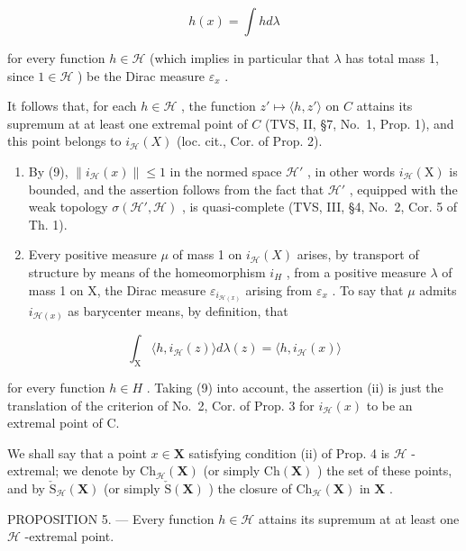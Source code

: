 \[
h (x) = \int h d \lambda\tag{10}
\]

for every function \(h \in \mathcal{H}\) (which implies in particular that \(\lambda\) has total mass 1, since \(1 \in \mathcal{H}\) ) be the Dirac measure \(\varepsilon_x\) .

It follows that, for each \(h \in \mathcal{H}\) , the function \(z' \mapsto \langle h, z' \rangle\) on \(C\) attains its supremum at at least one extremal point of \(C\) (TVS, II, §7, No.~1, Prop. 1), and this point belongs to \(i_{\mathcal{H}}(X)\) (loc. cit., Cor. of Prop. 2).

\begin{enumerate}
\def\labelenumi{(\roman{enumi})}
\item
  By (9), \(\| i_{\mathcal{H}}(x)\| \leqslant 1\) in the normed space \(\mathcal{H}'\) , in other words \(i_{\mathcal{H}}(\mathrm{X})\) is bounded, and the assertion follows from the fact that \(\mathcal{H}'\) , equipped with the weak topology \(\sigma (\mathcal{H}',\mathcal{H})\) , is quasi-complete (TVS, III, §4, No.~2, Cor. 5 of Th. 1).
\item
  Every positive measure \(\mu\) of mass 1 on \(i_{\mathcal{H}}(X)\) arises, by transport of structure by means of the homeomorphism \(i_{H}\) , from a positive measure \(\lambda\) of mass 1 on X, the Dirac measure \(\varepsilon_{i_{\mathcal{H}(x)}}\) arising from \(\varepsilon_{x}\) . To say that \(\mu\) admits \(i_{\mathcal{H}(x)}\) as barycenter means, by definition, that
\end{enumerate}

\[
\int_ {\mathrm{X}} \langle h, i _ {\mathcal {H}} (z) \rangle d \lambda (z) = \langle h, i _ {\mathcal {H}} (x) \rangle
\]

for every function \(h \in H\) . Taking (9) into account, the assertion (ii) is just the translation of the criterion of No.~2, Cor. of Prop. 3 for \(i_{\mathcal{H}}(x)\) to be an extremal point of C.

We shall say that a point \(x \in \mathbf{X}\) satisfying condition (ii) of Prop. 4 is \(\mathcal{H}\) -extremal; we denote by \(\mathrm{Ch}_{\mathcal{H}}(\mathbf{X})\) (or simply \(\mathrm{Ch}(\mathbf{X})\) ) the set of these points, and by \(\check{\mathrm{S}}_{\mathcal{H}}(\mathbf{X})\) (or simply \(\check{\mathrm{S}}(\mathbf{X})\) ) the closure of \(\mathrm{Ch}_{\mathcal{H}}(\mathbf{X})\) in \(\mathbf{X}\) .

PROPOSITION 5. --- Every function \(h \in \mathcal{H}\) attains its supremum at at least one \(\mathcal{H}\) -extremal point.

